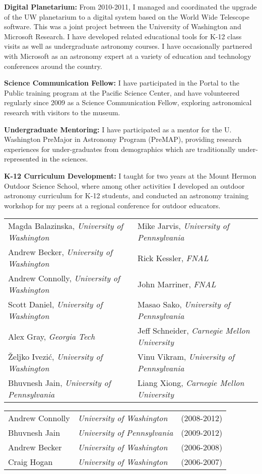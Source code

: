 \listing
{\bf Digital Planetarium:} From 2010-2011, I managed and coordinated the upgrade of the UW planetarium to a digital system based on the World Wide Telescope software. This was a joint project between the University of Washington and Microsoft Research. I have developed related educational tools for K-12 class visits as well as undergraduate astronomy courses. I have occasionally partnered with Microsoft as an astronomy expert at a variety of education and technology conferences around the country.

\listing
{\bf Science Communication Fellow:} I have participated in the Portal to the Public training program at the Paciﬁc Science Center, and have volunteered regularly since 2009 as a Science Communication Fellow, exploring astronomical research with visitors to the museum.

\listing
{\bf Undergraduate Mentoring:} I have participated as a mentor for the U. Washington PreMajor in Astronomy Program (PreMAP), providing research experiences for under-graduates from demographics which are traditionally under-represented in the sciences.

\listing
{\bf K-12 Curriculum Development:} I taught for two years at the Mount Hermon Outdoor Science School, where among other activities I developed an outdoor astronomy curriculum for K-12 students, and conducted an astronomy training workshop for my peers at a regional conference for outdoor educators.


 \hskip -0.1in \begin{tabular}{ll}
Magda Balazinska, {\it University of Washington} & Mike Jarvis, {\it University of Pennsylvania}\\
Andrew Becker, {\it University of Washington} & Rick Kessler, {\it FNAL}\\
Andrew Connolly, {\it University of Washington} & John Marriner, {\it FNAL}\\
Scott Daniel, {\it University of Washington} & Masao Sako, {\it University of Pennsylvania}\\
Alex Gray, {\it Georgia Tech} & Jeff Schneider, {\it Carnegie Mellon University}\\
\v{Z}eljko Ivezi\'{c}, {\it University of Washington} & Vinu Vikram, {\it University of Pennsylvania}\\
Bhuvnesh Jain, {\it University of Pennsylvania}& Liang Xiong, {\it Carnegie Mellon University}\\
\end{tabular}


\hskip -0.1in \begin{tabular}{lll}
  Andrew Connolly & {\it University of Washington} & (2008-2012)\\
  Bhuvnesh Jain & {\it University of Pennsylvania} & (2009-2012)\\
  Andrew Becker & {\it University of Washington} & (2006-2008)\\
  Craig Hogan & {\it University of Washington} & (2006-2007)\\
\end{tabular}


